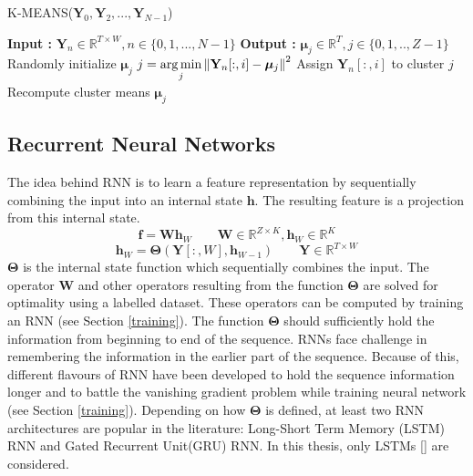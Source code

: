 \begin{algorithm}
  \caption{K-MEANS($\textbf{Y}_{0}, \textbf{Y}_{2},..., \textbf{Y}_{N-1}$) }\label{alg:kmeans}
  \begin{algorithmic}[1]
    \Statex \textbf{Input :} $\textbf{Y}_{n} \in \mathbb{R}^{T \times W}, n \in \{0,1,...,N-1\}$
    \Statex \textbf{Output :} $\bm{\mu}_{j} \in \mathbb{R}^{T}, j \in \{0,1,..,Z-1\}$
    \State Randomly initialize $\bm{\mu}_{j}$
         \State $j = \operatorname*{arg\,min}\limits_{j} \left\lVert\textbf{Y}_{n}[:,i] - \bm{\mu}_{j}\right\rVert^{2}$
          \State Assign $\textbf{Y}_{n}[:,i]$ to cluster $j$
      \EndFor
    \EndFor
   \State Recompute cluster means $\bm{\mu}_{j}$
   \EndWhile
  \end{algorithmic}
\end{algorithm}
\FloatBarrier

\subsection{Recurrent Neural Networks}
\label{rnn}
The idea behind RNN is to learn a feature representation by sequentially combining the input into an internal state $\textbf{h}$. The resulting feature is a projection from this internal state.
\[ 
\textbf{f} = \textbf{W}\textbf{h}_{W} \qquad \textbf{W} \in \mathbb{R}^{Z \times K}, \textbf{h}_{W} \in \mathbb{R}^{K}
\]
\[
\textbf{h}_{W} = \bm{\Theta}(\textbf{Y}[:,W], \textbf{h}_{W-1}) \qquad \textbf{Y} \in \mathbb{R}^{T \times W}
\]
$\bm{\Theta}$ is the internal state function which sequentially combines the input. The operator $\textbf{W}$ and other operators resulting from the function $\bm{\Theta}$ are solved for optimality using a labelled dataset. These operators can be computed by training an RNN (see Section \ref{training}). The function $\bm{\Theta}$ should sufficiently hold the information from beginning to end of the sequence. RNNs face challenge in remembering the information in the earlier part of the sequence. Because of this, different flavours of RNN have been developed to hold the sequence information longer and to battle the vanishing gradient problem while training neural network (see Section \ref{training}). Depending on how $\bm{\Theta}$ is defined, at least two RNN architectures are popular in the literature: Long-Short Term Memory (LSTM) RNN and Gated Recurrent Unit(GRU) RNN. In this thesis, only LSTMs [] are considered.   


